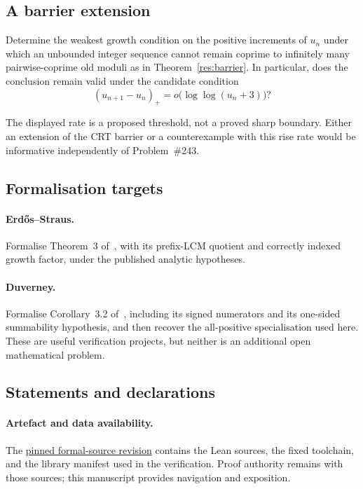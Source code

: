 \documentclass[11pt]{article}
\begin{document}
\subsection{A barrier extension}

\begin{problem}\label{res:variablerise}
Determine the weakest growth condition on the positive increments of $u_n$
under which an unbounded integer sequence cannot remain coprime to infinitely
many pairwise-coprime old moduli as in Theorem~\ref{res:barrier}.  In
particular, does the conclusion remain valid under the candidate condition
\[
 (u_{n+1}-u_n)_+=o\bigl(\log\log(u_n+3)\bigr)?
\]
\end{problem}

\noindent The displayed rate is a proposed threshold, not a proved sharp
boundary.  Either an extension of the CRT barrier or a counterexample with
this rise rate would be informative independently of Problem~\#243.

\subsection*{Formalisation targets}

\paragraph{Erd\H{o}s--Straus.}
Formalise Theorem~3 of~\cite{erdosstraus1964}, with its prefix-LCM quotient
and correctly indexed growth factor, under the published analytic hypotheses.

\paragraph{Duverney.}
Formalise Corollary~3.2 of~\cite{duverney2001}, including its signed
numerators and its one-sided summability hypothesis, and then recover the
all-positive specialisation used here.  These are useful verification
projects, but neither is an additional open mathematical problem.

\subsection*{Statements and declarations}

\paragraph{Artefact and data availability.} The
\href{\sourceurl}{pinned formal-source revision} contains the Lean sources, the
fixed toolchain, and the library manifest used in the verification.  Proof
authority remains with those sources; this manuscript provides navigation and
exposition.
\end{document}
